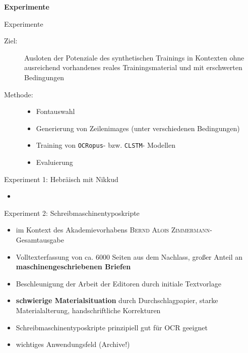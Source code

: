 \documentclass{bbawslides}
\begin{document}
\begin{bbawpart}{\Large\bf Experimente}
\end{bbawpart}

\begin{bbawslide}{Experimente}
  \vspace*{7mm}%
  \centerslidestrue%
  \begin{description}
    \item[Ziel:] Ausloten der Potenziale des synthetischen Trainings in Kontexten ohne ausreichend vorhandenes reales Trainingsmaterial und mit erschwerten Bedingungen
    \item[Methode:]
      \begin{itemize}
        \item Fontauswahl
        \item Generierung von Zeilenimages (unter verschiedenen Bedingungen)
        \item Training von \texttt{OCRopus}- bzw. \texttt{CLSTM}- Modellen
        \item Evaluierung
      \end{itemize}
  \end{description}
\end{bbawslide}

\begin{bbawslide}{Experiment 1: Hebräisch mit Nikkud}
  \vspace*{7mm}%
  \centerslidestrue%
  \begin{itemize}
    \item 
  \end{itemize}
\end{bbawslide}

\begin{bbawslide}{Experiment 2: Schreibmaschinentyposkripte}
  \vspace*{7mm}%
  \centerslidestrue%
  \begin{itemize}
    \item im Kontext des Akademievorhabens \textsc{Bernd Alois Zimmermann}-Gesamtausgabe
    \item Volltexterfassung von ca. 6000 Seiten aus dem Nachlass, großer Anteil an \textbf{maschinengeschriebenen Briefen}
    \item Beschleunigung der Arbeit der Editoren durch initiale Textvorlage
    \item \textbf{schwierige Materialsituation} durch Durchschlagpapier, starke Materialalterung, handschriftliche Korrekturen
    \item Schreibmaschinentyposkripte prinzipiell gut für OCR geeignet
    \item wichtiges Anwendungsfeld (Archive!)
  \end{itemize}
\end{bbawslide}
\end{document}

